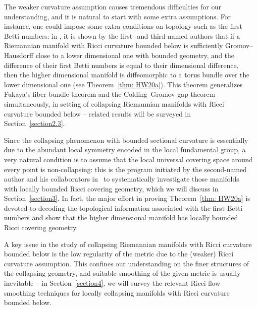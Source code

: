 \documentclass[10pt,a4paper]{amsart}
\numberwithin{equation}{section}
\begin{document}
The weaker curvature assumption causes tremendous
difficulties for our understanding, and it is natural to start with some
extra assumptions. For instance, one could impose some extra conditions on
topology such as the first Betti numbers: in \cite{HW20a}, it is shown
by the first- and third-named authors that if a Riemannian manifold with Ricci
curvature bounded below is sufficiently Gromov--Hausdorff close to a lower
dimensional one with bounded geometry, and the difference of their first Betti
numbers is equal to their dimensional difference, then the higher dimensional
manifold is diffeomorphic to a torus bundle over the lower dimensional one
(see Theorem~\ref{thm: HW20a}). This theorem generalizes Fukaya's fiber bundle
theorem and the Colding--Gromov gap theorem simultaneously, in setting of
collapsing Riemannian manifolds with Ricci curvature bounded below -- related
results will be surveyed in Section~\ref{section2.3}.

Since the collapsing phenomenon with bounded sectional curvature is essentially
due to the abundant local symmetry encoded in the local fundamental group, a
very natural condition is to assume that the local universal covering space
around every point is non-collapsing: this is the program initiated by the
second-named author and his collaborators in~\cite{HKRX18} to systematically
investigate those manifolds with locally bounded Ricci covering geometry, which
we will discuss in Section~\ref{section3}.
In fact, the major effort in proving Theorem~\ref{thm: HW20a} is devoted to
decoding the topological information associated with the first Betti numbers
and show that the higher dimensional manifold has locally bounded Ricci
covering geometry.

A key issue in the study of collapsing Riemannian manifolds with Ricci curvature
bounded below is the low regularity of the metric due to the (weaker) Ricci
curvature assumption. This confines our understanding on the finer structures
of the collapsing geometry, and suitable smoothing of the given metric is
usually inevitable -- in Section~\ref{section4}, we will survey the relevant Ricci flow
smoothing techniques for locally collapsing manifolds with Ricci curvature
bounded below.
\end{document}
